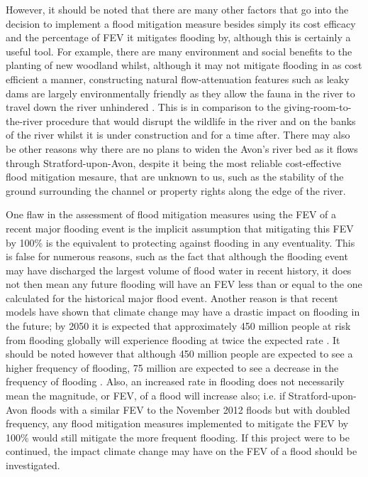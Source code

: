 \documentclass[11pt,a4paper]{article}
\begin{document}
However, it should be noted that there are many other factors that go into the decision to implement a flood mitigation measure besides simply its cost efficacy and the percentage of FEV it mitigates flooding by, although this is certainly a useful tool. For example, there are many environment and social benefits to the planting of new woodland whilst, although it may not mitigate flooding in as cost efficient a manner, constructing natural flow-attenuation features such as leaky dams are largely environmentally friendly as they allow the fauna in the river to travel down the river unhindered \cite{nfm}. This is in comparison to the giving-room-to-the-river procedure that would disrupt the wildlife in the river and on the banks of the river whilst it is under construction and for a time after. There may also be other reasons why there are no plans to widen the Avon's river bed as it flows through Stratford-upon-Avon, despite it being the most reliable cost-effective flood mitigation mesaure, that are unknown to us, such as the stability of the ground surrounding the channel or property rights along the edge of the river.

One flaw in the assessment of flood mitigation measures using the FEV of a recent major flooding event is the implicit assumption that mitigating this FEV by 100\% is the equivalent to protecting against flooding in any eventuality. This is false for numerous reasons, such as the fact that although the flooding event may have discharged the largest volume of flood water in recent history, it does not then mean any future flooding will have an FEV less than or equal to the one calculated for the historical major flood event. Another reason is that recent models have shown that climate change may have a drastic impact on flooding in the future{;} by 2050 it is expected that approximately 450 million people at risk from flooding globally will experience flooding at twice the expected rate \cite{climate}. It should be noted however that although 450 million people are expected to see a higher frequency of flooding, 75 million are expected to see a decrease in the frequency of flooding \cite{climate}. Also, an increased rate in flooding does not necessarily mean the magnitude, or FEV, of a flood will increase also{;} i.e. if Stratford-upon-Avon floods with a similar FEV to the November 2012 floods but with doubled frequency, any flood mitigation measures implemented to mitigate the FEV by 100\% would still mitigate the more frequent flooding. If this project were to be continued, the impact climate change may have on the FEV of a flood should be investigated.
\end{document}
